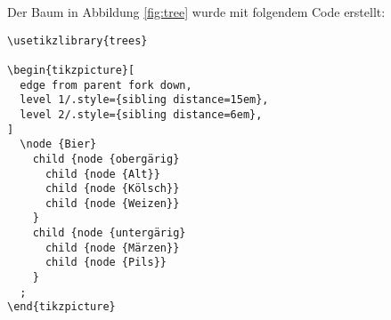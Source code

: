 % 

Der Baum in Abbildung \ref{fig:tree} wurde mit folgendem Code erstellt:
\begin{lstlisting}
\usetikzlibrary{trees}

\begin{tikzpicture}[
  edge from parent fork down,
  level 1/.style={sibling distance=15em},
  level 2/.style={sibling distance=6em},
]
  \node {Bier}
    child {node {obergärig}
      child {node {Alt}}
      child {node {Kölsch}}
      child {node {Weizen}}
    }
    child {node {untergärig}
      child {node {Märzen}}
      child {node {Pils}}
    }
  ;
\end{tikzpicture}
\end{lstlisting}